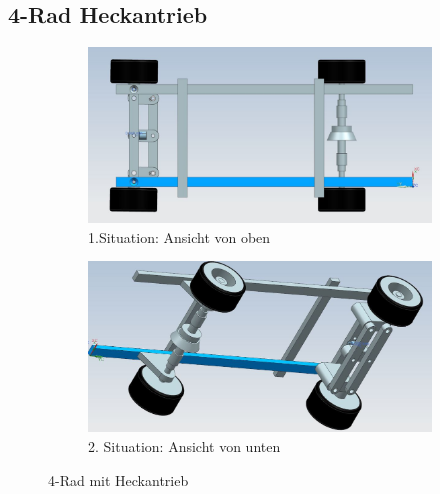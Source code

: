 \subsection{4-Rad Heckantrieb}

\begin{figure} [hbp]
	\centering
	\begin{subfigure}[b]{0.4\textwidth}
		\includegraphics[width=\textwidth]{fig/4Rad-1.JPG}
		\caption{1.Situation: Ansicht von oben}
	\end{subfigure}
	\hfill
	\begin{subfigure}[b]{0.36\textwidth}
		\includegraphics[width=\textwidth]{fig/4Rad-2.JPG}
		\caption{2. Situation: Ansicht von unten}
\end{subfigure}
	\caption{4-Rad mit Heckantrieb}\label{fig:animals}
\end{figure}

